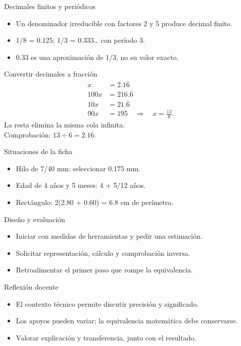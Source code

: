 \documentclass[
	spanish,
	aspectratio=1610,
	xcolor={dvipsnames,table}
]{beamer}
\begin{document}
\begin{frame}{Decimales finitos y periódicos}
\fontsize{14}{18}\selectfont\begin{itemize}\setlength{\itemsep}{.45cm}
\item Un denominador irreducible con factores 2 y 5 produce decimal finito.
\item 1/8 = 0.125; 1/3 = 0.333… con período 3.
\item 0.33 es una aproximación de 1/3, no su valor exacto.
\end{itemize}
\end{frame}
\begin{frame}{Convertir decimales a fracción}
\fontsize{14}{18}\selectfont
\begin{align*}x&=2.1\overline6\\100x&=216.\overline6\\10x&=21.\overline6\\90x&=195\quad\Rightarrow\quad x=\frac{13}{6}.\end{align*}
\centering La resta elimina la misma cola infinita.\\[.2cm]Comprobación: $13\div6=2.1\overline6$.
\end{frame}
\begin{frame}{Situaciones de la ficha}
\fontsize{14}{18}\selectfont\begin{itemize}\setlength{\itemsep}{.45cm}
\item Hilo de 7/40 mm: seleccionar 0.175 mm.
\item Edad de 4 años y 5 meses: 4 + 5/12 años.
\item Rectángulo: 2(2.80 + 0.60) = 6.8 cm de perímetro.
\end{itemize}
\end{frame}
\begin{frame}{Diseño y evaluación}
\fontsize{14}{18}\selectfont\begin{itemize}\setlength{\itemsep}{.45cm}
\item Iniciar con medidas de herramientas y pedir una estimación.
\item Solicitar representación, cálculo y comprobación inversa.
\item Retroalimentar el primer paso que rompe la equivalencia.
\end{itemize}
\end{frame}
\begin{frame}{Reflexión docente}
\fontsize{14}{18}\selectfont\begin{itemize}\setlength{\itemsep}{.45cm}
\item El contexto técnico permite discutir precisión y significado.
\item Los apoyos pueden variar; la equivalencia matemática debe conservarse.
\item Valorar explicación y transferencia, junto con el resultado.
\end{itemize}
\end{frame}
\end{document}
